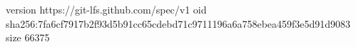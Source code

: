 version https://git-lfs.github.com/spec/v1
oid sha256:7fa6cf7917b2f93d5b91cc65cdebd71c9711196a6a758ebea459f3e5d91d9083
size 66375
